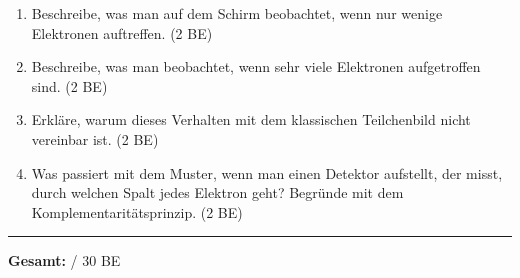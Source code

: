 \documentclass[11pt,a4paper]{article}
\begin{document}
\begin{enumerate}[label=\alph*)]
\item Beschreibe, was man auf dem Schirm beobachtet, wenn nur wenige Elektronen auftreffen. \hfill (2 BE)

\vspace{1.5cm}

\item Beschreibe, was man beobachtet, wenn sehr viele Elektronen aufgetroffen sind. \hfill (2 BE)

\vspace{1.5cm}

\item Erkläre, warum dieses Verhalten mit dem klassischen Teilchenbild nicht vereinbar ist. \hfill (2 BE)

\vspace{1.5cm}

\item Was passiert mit dem Muster, wenn man einen Detektor aufstellt, der misst, durch welchen Spalt jedes Elektron geht? Begründe mit dem Komplementaritätsprinzip. \hfill (2 BE)

\vspace{1.5cm}

\end{enumerate}

\begin{center}
\rule{10cm}{0.5pt}

\textbf{Gesamt:} \underline{\hspace{1cm}} / 30 BE
\end{center}
\end{document}

